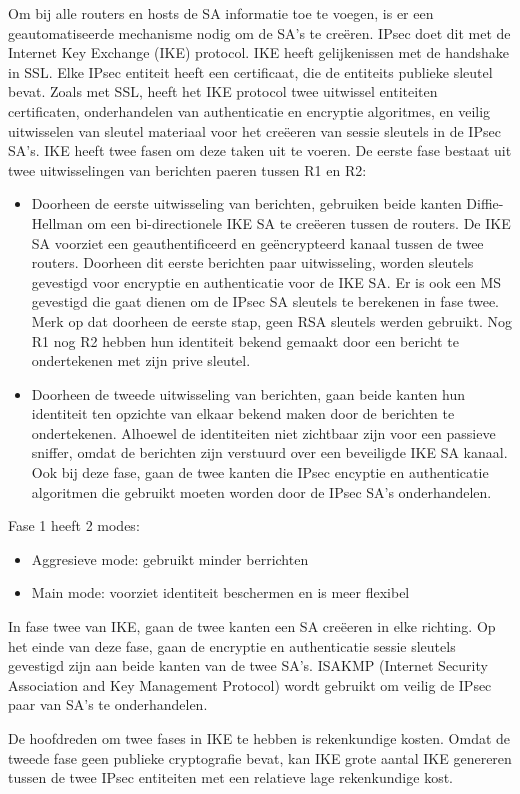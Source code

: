 Om bij alle routers en hosts de SA informatie toe te voegen, is er een geautomatiseerde mechanisme nodig om de SA’s te creëren. IPsec doet dit met de Internet Key Exchange (IKE) protocol. IKE heeft gelijkenissen met de handshake in SSL. Elke IPsec entiteit heeft een certificaat, die de entiteits publieke sleutel bevat. Zoals met SSL, heeft het IKE protocol twee uitwissel entiteiten certificaten, onderhandelen van authenticatie en encryptie algoritmes, en veilig uitwisselen van sleutel materiaal voor het creëeren van sessie sleutels in de IPsec SA’s.
IKE heeft twee fasen om deze taken uit te voeren. De eerste fase bestaat uit twee uitwisselingen van berichten paeren tussen R1 en R2:
\begin{itemize}
\item Doorheen de eerste uitwisseling van berichten, gebruiken beide kanten Diffie-Hellman om een bi-directionele IKE SA te creëeren tussen de routers. De IKE SA voorziet een geauthentificeerd en geëncrypteerd kanaal tussen de twee routers. Doorheen dit eerste berichten paar uitwisseling, worden sleutels gevestigd voor encryptie en authenticatie voor de IKE SA. Er is ook een MS gevestigd die gaat dienen om de IPsec SA sleutels te berekenen in fase twee.
Merk op dat doorheen de eerste stap, geen RSA sleutels werden gebruikt. Nog R1 nog R2 hebben hun identiteit bekend gemaakt door een bericht te ondertekenen met zijn prive sleutel.
\item Doorheen de tweede uitwisseling van berichten, gaan beide kanten hun identiteit ten opzichte van elkaar bekend maken door de berichten te ondertekenen. Alhoewel de identiteiten niet zichtbaar zijn voor een passieve sniffer, omdat de berichten zijn verstuurd over een beveiligde IKE SA kanaal. Ook bij deze fase, gaan de twee kanten die IPsec encyptie en authenticatie algoritmen die gebruikt moeten worden door de IPsec SA’s onderhandelen.
\end{itemize}

Fase 1 heeft 2 modes:
\begin{itemize}
\item Aggresieve mode: gebruikt minder berrichten
\item Main mode: voorziet identiteit beschermen en is meer flexibel
\end{itemize}

In fase twee van IKE, gaan de twee kanten een SA creëeren in elke richting. Op het einde van deze fase, gaan de encryptie en authenticatie sessie sleutels gevestigd zijn aan beide kanten van de twee SA’s. ISAKMP (Internet Security Association and Key Management Protocol) wordt gebruikt om veilig de IPsec paar van SA’s te onderhandelen.

De hoofdreden om twee fases in IKE te hebben is rekenkundige kosten. Omdat de tweede fase geen publieke cryptografie bevat, kan IKE grote aantal IKE genereren tussen de twee IPsec entiteiten met een relatieve lage rekenkundige kost.
